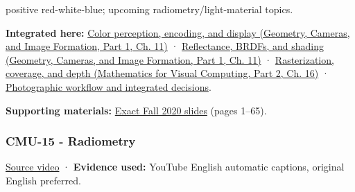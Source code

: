 positive red-white-blue; upcoming radiometry/light-material topics.

\textbf{Integrated here:} \href{../03-Geometry-Cameras-and-Image-Formation-P01/main.pdf\#nameddest=03-visual-computing-i-ch004-color-perception-encoding-and-display}{Color perception, encoding, and display (Geometry, Cameras, and Image Formation, Part 1, Ch. 11)} · \href{../03-Geometry-Cameras-and-Image-Formation-P01/main.pdf\#nameddest=03-visual-computing-i-ch004-reflectance-brdfs-and-shading}{Reflectance, BRDFs, and shading (Geometry, Cameras, and Image Formation, Part 1, Ch. 11)} · \href{../02-Mathematics-for-Visual-Computing-P02/main.pdf\#nameddest=03-visual-computing-i-ch012-rasterization-coverage-and-depth}{Rasterization, coverage, and depth (Mathematics for Visual Computing, Part 2, Ch. 16)} · \hyperref[04-visual-computing-ii-ch034-photographic-workflow-and-integrated-decisions]{Photographic workflow and integrated decisions}.

\textbf{Supporting materials:} \href{https://15462.courses.cs.cmu.edu/fall2020content/lectures/14_color/14_color_slides.pdf}{Exact Fall 2020 slides} (pages 1--65).

\subsubsection{CMU-15 - Radiometry}\label{04-visual-computing-ii-ch036-cmu-15---radiometry}

\hypertarget{04-visual-computing-ii-ch036-cmu-15---radiometry}{}

\href{https://www.youtube.com/watch?v=5lGYm8L_rfo}{Source video} · \textbf{Evidence used:} YouTube English automatic captions, original English preferred.

